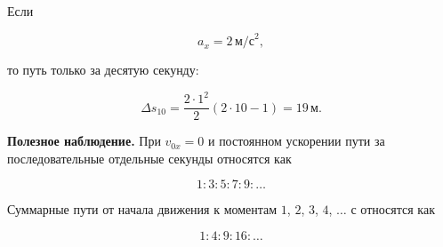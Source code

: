 \documentclass[a4paper,12pt]{article}
\newcommand{\mss}{\,\text{м/с}^2}
\newcommand{\important}[1]{\textcolor{darkaccent}{\textbf{#1}}}
\begin{document}
Если

\[
a_x=2\mss,
\]

то путь только за десятую секунду:

\[
\Delta s_{10}
=
\frac{2\cdot1^2}{2}
(2\cdot10-1)
=
19\,\text{м}.
\]

\important{Полезное наблюдение.}
При $v_{0x}=0$ и постоянном ускорении
пути за последовательные отдельные секунды
относятся как

\[
1:3:5:7:9:\ldots
\]

Суммарные пути от начала движения
к моментам $1$, $2$, $3$, $4$, $\ldots$ с
относятся как

\[
1:4:9:16:\ldots
\]


\clearpage
\thispagestyle{empty}
\end{document}

